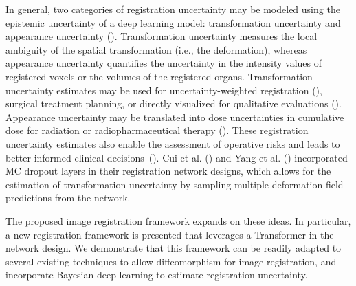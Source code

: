 \documentclass[times,twocolumn,final]{elsarticle}
\begin{document}
In general, two categories of registration uncertainty may be modeled using the epistemic uncertainty of a deep learning model: transformation uncertainty and appearance uncertainty (\cite{luo2019applicability, xu2021double}). Transformation uncertainty measures the local ambiguity of the spatial transformation (i.e., the deformation), whereas appearance uncertainty quantifies the uncertainty in the intensity values of registered voxels or the volumes of the registered organs. Transformation uncertainty estimates may be used for uncertainty-weighted registration (\cite{simpson2011longitudinal, kybic2009bootstrap}), surgical treatment planning, or directly visualized for qualitative evaluations (\cite{yang2017quicksilver}). Appearance uncertainty may be translated into dose uncertainties in cumulative dose for radiation or radiopharmaceutical therapy (\cite{risholm2011estimation, vickress2017representing, chetty2019deformable, gear2018eanm}). These registration uncertainty estimates also enable the assessment of operative risks and leads to better-informed clinical decisions~(\cite{luo2019applicability}). Cui et al. (\cite{cui2021bayesian}) and Yang et al. (\cite{yang2017quicksilver}) incorporated MC dropout layers in their registration network designs, which allows for the estimation of transformation uncertainty by sampling multiple deformation field predictions from the network.

The proposed image registration framework expands on these ideas. In particular, a new registration framework is presented that leverages a Transformer in the network design. We demonstrate that this framework can be readily adapted to several existing techniques to allow diffeomorphism for image registration, and incorporate Bayesian deep learning to estimate registration uncertainty. 
\end{document}
